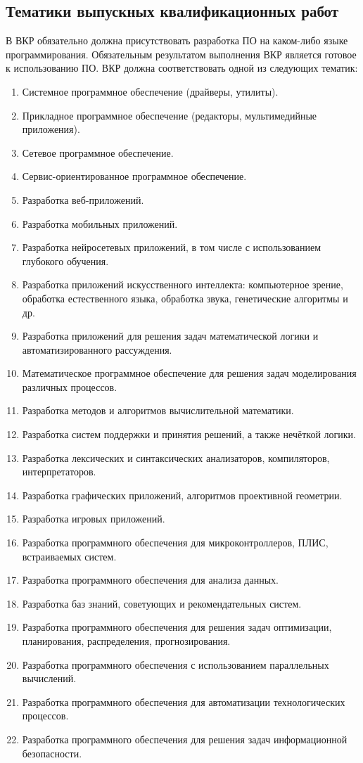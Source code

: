 \documentclass[14pt]{extarticle}
\begin{document}
\subsection{Тематики выпускных квалификационных работ}

В ВКР обязательно должна присутствовать разработка ПО на каком-либо языке программирования. Обязательным результатом выполнения ВКР является готовое к использованию ПО.
ВКР должна соответствовать одной из следующих тематик:
\begin{enumerate}[label=\arabic*.]
	\item Системное программное обеспечение (драйверы, утилиты).
	\item Прикладное программное обеспечение (редакторы, мультимедийные приложения).
	\item Сетевое программное обеспечение.
	\item Сервис-ориентированное программное обеспечение.
	\item Разработка веб-приложений.
	\item Разработка мобильных приложений.
	\item Разработка нейросетевых приложений, в том числе с использованием глубокого обучения.
	\item Разработка приложений искусственного интеллекта: компьютерное зрение, обработка естественного языка, обработка звука, генетические алгоритмы и др.
	\item Разработка приложений для решения задач математической логики и автоматизированного рассуждения.
	\item Математическое программное обеспечение для решения задач моделирования различных процессов.
	\item Разработка методов и алгоритмов вычислительной математики.
	\item Разработка систем поддержки и принятия решений, а также нечёткой логики.
	\item Разработка лексических и синтаксических анализаторов, компиляторов, интерпретаторов.
	\item Разработка графических приложений, алгоритмов проективной геометрии.
	\item Разработка игровых приложений.
	\item Разработка программного обеспечения для микроконтроллеров, ПЛИС, встраиваемых систем.
	\item Разработка программного обеспечения для анализа данных.
	\item Разработка баз знаний, советующих и рекомендательных систем.
	\item Разработка программного обеспечения для решения задач оптимизации, планирования, распределения, прогнозирования.
	\item Разработка программного обеспечения с использованием параллельных вычислений.
	\item Разработка программного обеспечения для автоматизации
	технологических процессов.
	\item Разработка программного обеспечения для решения задач информационной безопасности.
\end{enumerate}
\end{document}
